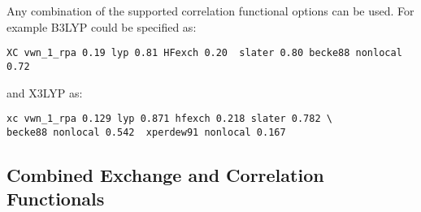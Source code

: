 %
%
%

%

\fussy

Any combination of the supported correlation functional options can be
used.  For example  B3LYP could be specified as:
\begin{verbatim}
XC vwn_1_rpa 0.19 lyp 0.81 HFexch 0.20  slater 0.80 becke88 nonlocal 0.72
\end{verbatim}
and X3LYP as:
\begin{verbatim}
xc vwn_1_rpa 0.129 lyp 0.871 hfexch 0.218 slater 0.782 \
becke88 nonlocal 0.542  xperdew91 nonlocal 0.167 
\end{verbatim}

  
\subsection{Combined Exchange and Correlation Functionals}

